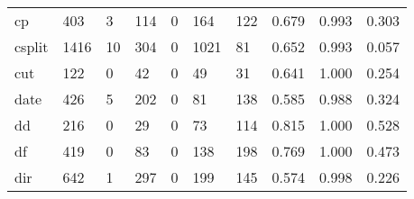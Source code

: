 \begin{longtable}{lp{1.3cm}p{1.3cm}p{1.3cm}p{1.3cm}p{1.3cm}p{1.3cm}p{1.3cm}p{1.3cm}p{1.3cm}}
cp        &                    403 &                                  3 &                               114 &                                0 &                               164 &                             122 &                                0.679 &                                  0.993 &                                0.303 \\
csplit    &                   1416 &                                 10 &                               304 &                                0 &                              1021 &                              81 &                                0.652 &                                  0.993 &                                0.057 \\
cut       &                    122 &                                  0 &                                42 &                                0 &                                49 &                              31 &                                0.641 &                                  1.000 &                                0.254 \\
date      &                    426 &                                  5 &                               202 &                                0 &                                81 &                             138 &                                0.585 &                                  0.988 &                                0.324 \\
dd        &                    216 &                                  0 &                                29 &                                0 &                                73 &                             114 &                                0.815 &                                  1.000 &                                0.528 \\
df        &                    419 &                                  0 &                                83 &                                0 &                               138 &                             198 &                                0.769 &                                  1.000 &                                0.473 \\
dir       &                    642 &                                  1 &                               297 &                                0 &                               199 &                             145 &                                0.574 &                                  0.998 &                                0.226 \\

\end{longtable}
